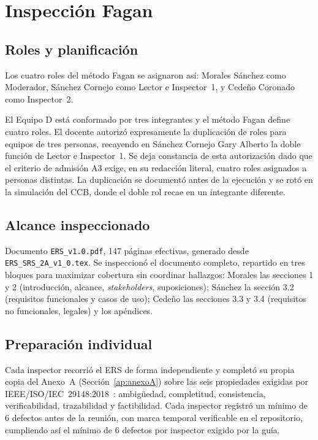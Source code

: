 \documentclass[journal,onecolumn]{IEEEtran}
\begin{document}
	\section{Inspección Fagan}
	\label{sec:fagan}
	
	\subsection{Roles y planificación}
	
	Los cuatro roles del método Fagan se asignaron así: Morales Sánchez
	como Moderador, Sánchez Cornejo como Lector e Inspector~1, y
	Cedeño Coronado como Inspector~2.
	
	El Equipo D está conformado por tres integrantes y el método Fagan
	define cuatro roles. El docente autorizó expresamente la
	duplicación de roles para equipos de tres personas, recayendo en
	Sánchez Cornejo Gary Alberto la doble función de Lector e
	Inspector~1. Se deja constancia de esta autorización dado que el
	criterio de admisión A3 exige, en su redacción literal, cuatro
	roles asignados a personas distintas. La duplicación se documentó
	antes de la ejecución y se rotó en la simulación del CCB, donde el
	doble rol recae en un integrante diferente.
	
	\subsection{Alcance inspeccionado}
	
	Documento \texttt{ERS\_v1.0.pdf}, 147 páginas efectivas, generado
	desde \texttt{ERS\_SRS\_2A\_v1\_0.tex}. Se inspeccionó el documento
	completo, repartido en tres bloques para maximizar cobertura sin
	coordinar hallazgos: Morales las secciones 1 y 2 (introducción,
	alcance, \emph{stakeholders}, suposiciones); Sánchez la
	sección 3.2 (requisitos funcionales y casos de uso); Cedeño las
	secciones 3.3 y 3.4 (requisitos no funcionales, legales) y los
	apéndices.
	
	\subsection{Preparación individual}
	
	Cada inspector recorrió el ERS de forma independiente y completó
	su propia copia del Anexo~A (Sección~\ref{ap:anexoA}) sobre las
	seis propiedades exigidas por
	IEEE/ISO/IEC~29148:2018~\cite{ieee29148_2018}: ambigüedad,
	completitud, consistencia, verificabilidad, trazabilidad y
	factibilidad. Cada inspector registró un mínimo de 6 defectos
	antes de la reunión, con marca temporal verificable en el
	repositorio, cumpliendo así el mínimo de 6 defectos por inspector
	exigido por la guía.
	
\end{document}

